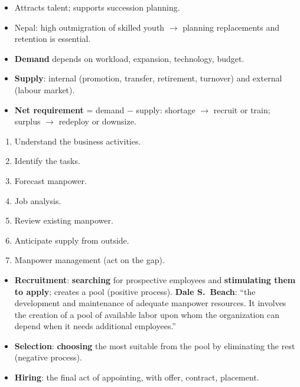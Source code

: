 {\begin{itemize}
  \item Attracts talent; supports succession planning.
  \item Nepal: high outmigration of skilled youth $\rightarrow$ planning replacements and
    retention is essential.
\end{itemize}
\begin{itemize}
  \item \textbf{Demand} depends on workload, expansion, technology, budget.
  \item \textbf{Supply}: internal (promotion, transfer, retirement, turnover) and external
    (labour market).
  \item \textbf{Net requirement} = demand $-$ supply: shortage $\rightarrow$ recruit or
    train; surplus $\rightarrow$ redeploy or downsize.
\end{itemize}
\begin{enumerate}
  \item Understand the business activities.
  \item Identify the tasks.
  \item Forecast manpower.
  \item Job analysis.
  \item Review existing manpower.
  \item Anticipate supply from outside.
  \item Manpower management (act on the gap).
\end{enumerate}}

\vspace{2pt}


{\color{sub}\footnotesize {} }

\begin{itemize}
  \item \textbf{Recruitment}: \textbf{searching} for prospective employees and
    \textbf{stimulating them to apply}; creates a pool (positive process).
    \textbf{Dale S.\ Beach}: ``the development and maintenance of adequate manpower resources.
    It involves the creation of a pool of available labor upon whom the organization can
    depend when it needs additional employees.''
  \item \textbf{Selection}: \textbf{choosing} the most suitable from the pool by
    eliminating the rest (negative process).
  \item \textbf{Hiring}: the final act of appointing, with offer, contract, placement.
\end{itemize}

